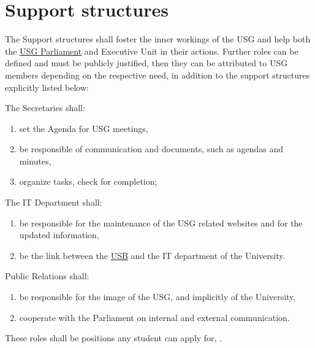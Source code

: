 \section{Support structures} 
\label{suppstrucdef}
The Support structures shall foster the inner workings of the USG and help both the \hyperref[USGParliamentDef]{USG Parliament} and Executive Unit in their actions. Further roles can be defined and must be publicly justified, then they can be attributed to USG members depending on the respective need, in addition to the support structures explicitly listed below:
\begin{parenum}
\item The Secretaries shall:
\begin{enumerate}
\item set the Agenda for USG meetings,
\item be responsible of communication and documents, such as agendas and minutes,
\item organize tasks, check for completion;
\end{enumerate}

\item The IT Department shall:
\begin{enumerate}
\item be responsible for the maintenance of the USG related websites and for the updated information,
\item be the link between the \hyperref[studentbody]{USB} and the IT department of the University.
\end{enumerate}

\item Public Relations  shall:
\begin{enumerate}
    \item be responsible for the image of the USG, and implicitly of the University, 
    \item cooperate with the Parliament on internal and external communication.
\end{enumerate}
\end{parenum}
These roles shall be positions any student can apply for, .